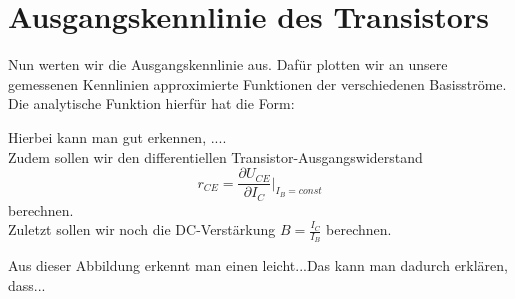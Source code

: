 

\section{Ausgangskennlinie des Transistors}
Nun werten wir die Ausgangskennlinie aus. Daf\"ur plotten wir an unsere gemessenen Kennlinien approximierte Funktionen der verschiedenen Basisstr\"ome. Die analytische Funktion hierf\"ur hat die Form:


Hierbei kann man gut erkennen, ....\\
Zudem sollen wir den differentiellen Transistor-Ausgangswiderstand
\begin{equation}
r_{CE}=\frac{\partial{U_{CE}}}{\partial{I_C}}\Bigg|_{I_B=const}
\end{equation}
berechnen. \\
Zuletzt sollen wir noch die DC-Verst\"arkung $B=\frac{I_C}{I_B}$ berechnen. %


Aus dieser Abbildung erkennt man einen leicht...Das kann man dadurch erkl\"aren, dass...\\


